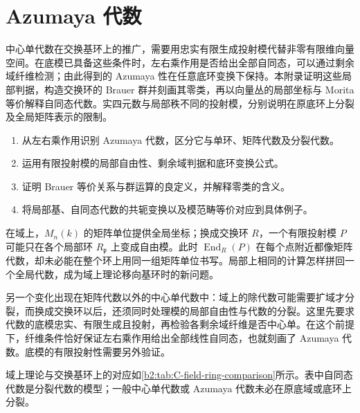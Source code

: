 
\chapter{Azumaya 代数}
\label{b2:app:C}

\begin{chapterabstract}
	中心单代数在交换基环上的推广，需要用忠实有限生成投射模代替非零有限维向量空间。在底模已具备这些条件时，左右乘作用是否给出全部自同态，可以通过剩余域纤维检测；由此得到的 Azumaya 性在任意底环变换下保持。本附录证明这些局部判据，构造交换环的 Brauer 群并刻画其零类，再以向量丛的局部坐标与 Morita 等价解释自同态代数。实四元数与局部秩不同的投射模，分别说明在原底环上分裂及全局矩阵表示的限制。
\end{chapterabstract}

\begin{learninggoals}
	\begin{enumerate}
		\item 从左右乘作用识别 Azumaya 代数，区分它与单环、矩阵代数及分裂代数。
		\item 运用有限投射模的局部自由性、剩余域判据和底环变换公式。
		\item 证明 Brauer 等价关系与群运算的良定义，并解释零类的含义。
		\item 将局部基、自同态代数的共轭变换以及模范畴等价对应到具体例子。
	\end{enumerate}
\end{learninggoals}

在域上，\(M_n(k)\) 的矩阵单位提供全局坐标；换成交换环 \(R\)，一个有限投射模 \(P\) 可能只在各个局部环 \(R_{\mathfrak p}\) 上变成自由模。此时 \(\operatorname{End}_R(P)\) 在每个点附近都像矩阵代数，却未必能在整个环上用同一组矩阵单位书写。局部上相同的计算怎样拼回一个全局代数，成为域上理论移向基环时的新问题。

\ProseParagraphBreak

另一个变化出现在矩阵代数以外的中心单代数中：域上的除代数可能需要扩域才分裂，而换成交换环以后，还须同时处理模的局部自由性与代数的分裂。这里先要求代数的底模忠实、有限生成且投射，再检验各剩余域纤维是否中心单。在这个前提下，纤维条件恰好保证左右乘作用给出全部线性自同态，也就刻画了 Azumaya 代数。底模的有限投射性需要另外验证。

\ProseParagraphBreak
域上理论与交换基环上的对应如\cref{b2:tab:C-field-ring-comparison}所示。表中自同态代数是分裂代数的模型；一般中心单代数或 Azumaya 代数未必在原底域或底环上分裂。

